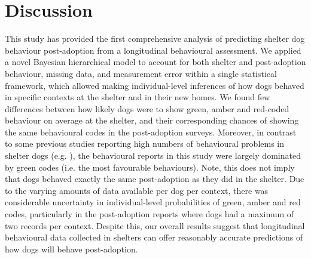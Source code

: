 \documentclass[12pt]{article}
\begin{document}
\section{Discussion}
This study has provided the first comprehensive analysis of predicting shelter dog behaviour post-adoption from a longitudinal behavioural assessment. We applied a novel Bayesian hierarchical model to account for both shelter and post-adoption behaviour, missing data, and measurement error within a single statistical framework, which allowed making individual-level inferences of how dogs behaved in specific contexts at the shelter and in their new homes. We found few differences between how likely dogs were to show green, amber and red-coded behaviour on average at the shelter, and their corresponding chances of showing the same behavioural codes in the post-adoption surveys. Moreover, in contrast to some previous studies reporting high numbers of behavioural problems in shelter dogs (e.g. \cite{gates2018}), the behavioural reports in this study were largely dominated by green codes (i.e. the most favourable behaviours). Note, this does not imply that dogs behaved exactly the same post-adoption as they did in the shelter. Due to the varying amounts of data available per dog per context, there was considerable uncertainty in individual-level probabilities of green, amber and red codes, particularly in the post-adoption reports where dogs had a maximum of two records per context. Despite this, our overall results suggest that longitudinal behavioural data collected in shelters can offer reasonably accurate predictions of how dogs will behave post-adoption.
\end{document}
